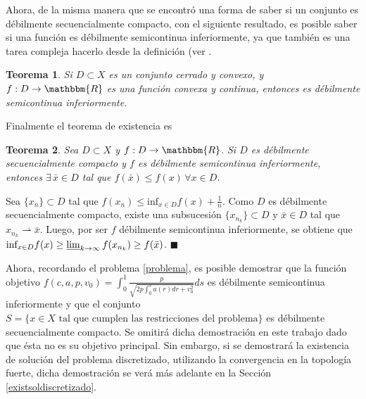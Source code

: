 \documentclass[a4paper,10pt]{book}
\newcommand{\R}{\mathbbm{R}}
\newcommand{\arr}{\rightarrow}
\newcommand{\bx}{\bar{x}}
\newcommand{\deb}{\rightharpoonup}
\newtheorem{teo}{Teorema}%
\newenvironment{dem}{\vspace*{-0.1cm}{\it Demostraci\'on:}}{\hfill
$\blacksquare$\\}
\begin{document}
Ahora, de la misma manera que se encontró una forma de saber si un conjunto es débilmente secuencialmente compacto, con el siguiente resultado, es posible saber si una función es débilmente semicontinua inferiormente, ya que también es una tarea compleja hacerlo desde la definición (ver \cite[Corollary 3.9.]{brezis2010functional}.

\begin{teo}\label{convycont}
Si $D\subset X$ es un conjunto cerrado y convexo, y $f:D\arr\R$ es una función convexa y continua, entonces es débilmente semicontinua inferiormente.
\end{teo}

Finalmente el teorema de existencia es
\begin{teo}\label{globalsol}
Sea $D\subset X$ y $f:D\arr\R$. Si $D$ es débilmente secuencialmente compacto y $f$ es débilmente semicontinua inferiormente, entonces $\exists\, \bx\in D$ tal que $f(\bx)\leq f (x)\,\forall x\in D$.
\end{teo}
\begin{dem}
Sea $\{x_n\}\subset D$ tal que $f(x_n)\leq \mbox{inf}_{x\in D}f(x)+\frac{1}{n}$. Como $D$ es débilmente secuencialmente compacto, existe una subsucesión $\{x_{n_k}\}\subset D$ y $\bx\in D$ tal que $x_{n_k}\deb\bx$. Luego, por ser $f$ débilmente semicontinua inferiormente, se obtiene que $\mbox{inf}_{x\in D}f(x)\geq\varliminf_{k\to\infty}f(x_{n_k})\geq f(\bx)$.
\end{dem}

Ahora, recordando el problema \eqref{problema}, es posible demostrar que la función objetivo $f(c,a,p,v_0)=\int_{0}^{1} \frac{p}{\sqrt{2p \int_0^s a(r)dr + v_0^2}}ds$ es débilmente semicontinua inferiormente y que el conjunto $S=\{x\in X\mbox{ tal que cumplen las restricciones del problema}\}$ es débilmente secuencialmente compacto. Se omitirá dicha demostración en este trabajo dado que ésta no es su objetivo principal. Sin embargo, si se demostrará la existencia de solución del problema discretizado, utilizando la convergencia en la topología fuerte, dicha demostración se verá más adelante en la Sección \eqref{existsoldiscretizado}. 

\end{document}

